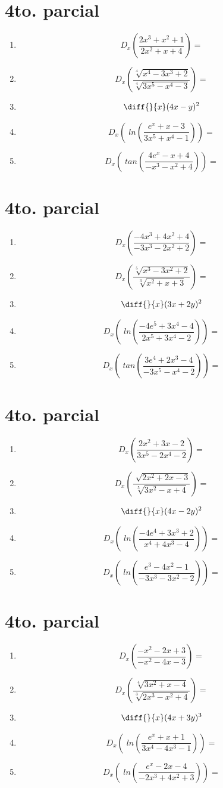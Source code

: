 \documentclass[oneside,spanish,letter]{article}
\begin{document}
\section{4to. parcial}
\begin{enumerate}
 \item $$ D_x \left( \frac{2x^3+x^2+1}{2x^2+x+4}\right)=$$
 \item $$ D_x \left( \frac{\sqrt[4]{x^4-3x^3+2}}{\sqrt[4]{3x^5-x^4-3}}\right)=$$
\item $$\diff{}{x}(4x-y)^2$$
 \item $$ D_x \left(\;ln\left( \frac{e^x+x-3}{3x^5+x^4-1}\right)\right)=$$
 \item $$ D_x \left(\;tan\left( \frac{4e^x-x+4}{-x^3-x^2+4}\right)\right)=$$
 \end{enumerate}
  \newpage
\section{4to. parcial}
\begin{enumerate}
 \item $$ D_x \left( \frac{-4x^3+4x^2+4}{-3x^3-2x^2+2}\right)=$$
 \item $$ D_x \left( \frac{\sqrt[5]{x^3-3x^2+2}}{\sqrt[3]{x^2+x+3}}\right)=$$
\item $$\diff{}{x}(3x+2y)^2$$
 \item $$ D_x \left(\;ln\left( \frac{-4e^5+3x^4-4}{2x^5+3x^4-2}\right)\right)=$$
 \item $$ D_x \left(\;tan\left( \frac{3e^4+2x^3-4}{-3x^5-x^4-2}\right)\right)=$$
 \end{enumerate}
  \newpage
\section{4to. parcial}
\begin{enumerate}
 \item $$ D_x \left( \frac{2x^2+3x-2}{3x^5-2x^4-2}\right)=$$
 \item $$ D_x \left( \frac{\sqrt[]{2x^2+2x-3}}{\sqrt[5]{3x^2-x+4}}\right)=$$
\item $$\diff{}{x}(4x-2y)^2$$
 \item $$ D_x \left(\;ln\left( \frac{-4e^4+3x^3+2}{x^4+4x^3-4}\right)\right)=$$
 \item $$ D_x \left(\;ln\left( \frac{e^3-4x^2-1}{-3x^3-3x^2-2}\right)\right)=$$
 \end{enumerate}
  \newpage
\section{4to. parcial}
\begin{enumerate}
 \item $$ D_x \left( \frac{-x^2-2x+3}{-x^2-4x-3}\right)=$$
 \item $$ D_x \left( \frac{\sqrt[4]{3x^2+x-4}}{\sqrt[3]{2x^3-x^2+4}}\right)=$$
\item $$\diff{}{x}(4x+3y)^3$$
 \item $$ D_x \left(\;ln\left( \frac{e^x+x+1}{3x^4-4x^3-1}\right)\right)=$$
 \item $$ D_x \left(\;ln\left( \frac{e^x-2x-4}{-2x^3+4x^2+3}\right)\right)=$$
 \end{enumerate}
  \newpage
\end{document}
